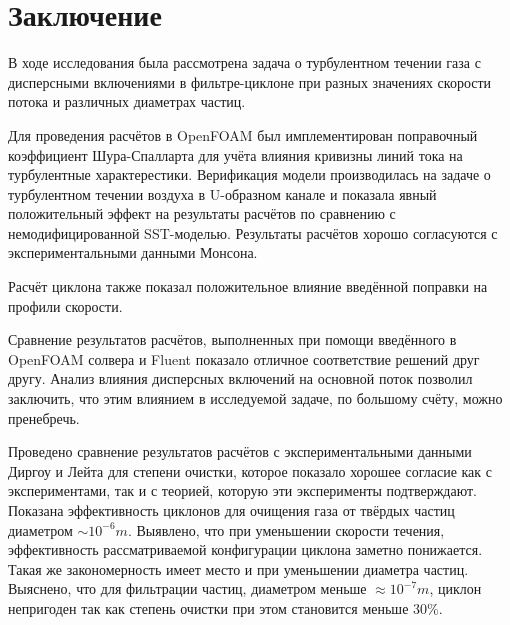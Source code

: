 \section*{Заключение}

В ходе исследования была рассмотрена задача о турбулентном течении газа с дисперсными включениями в фильтре-циклоне при разных значениях скорости потока и различных диаметрах частиц.

Для проведения расчётов в OpenFOAM был имплементирован поправочный коэффициент Шура-Спалларта для учёта влияния кривизны линий тока на турбулентные характерестики. Верификация модели производилась на задаче о турбулентном течении воздуха в U-образном канале и показала явный положительный эффект на результаты расчётов по сравнению с немодифицированной SST-моделью. Результаты расчётов хорошо согласуются с экспериментальными данными Монсона.

Расчёт циклона также показал положительное влияние введённой поправки на профили скорости. 

Сравнение результатов расчётов, выполненных при помощи введённого в OpenFOAM солвера и Fluent показало отличное соответствие решений друг другу. Анализ влияния дисперсных включений на основной поток позволил заключить, что этим влиянием в исследуемой задаче, по большому счёту, можно пренебречь.

Проведено сравнение результатов расчётов с экспериментальными данными Диргоу и Лейта для степени очистки, которое показало хорошее согласие как с экспериментами, так и с теорией, которую эти эксперименты подтверждают. Показана эффективность циклонов для очищения газа от твёрдых частиц диаметром $\sim 10^{-6}m$. Выявлено, что при уменьшении скорости течения, эффективность рассматриваемой конфигурации циклона заметно понижается. Такая же закономерность имеет место и при уменьшении диаметра частиц. Выяснено, что для фильтрации частиц, диаметром меньше $\approx 10^{-7}m$, циклон непригоден так как степень очистки при этом становится меньше 30\%.